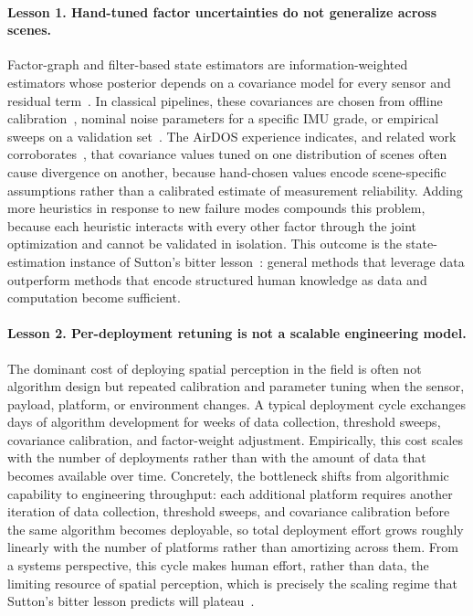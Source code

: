 \paragraph{Lesson 1. Hand-tuned factor uncertainties do not generalize across scenes.}
Factor-graph and filter-based state estimators are information-weighted estimators whose posterior depends on a covariance model for every sensor and residual term~\cite{barfoot2017state}.
In classical pipelines, these covariances are chosen from offline calibration~\cite{rehder2016extending}, nominal noise parameters for a specific IMU grade, or empirical sweeps on a validation set~\cite{qin2018vins}.
The AirDOS experience indicates, and related work corroborates~\cite{yang2020d3vo, muhle2023learning, solodar2023vio}, that covariance values tuned on one distribution of scenes often cause divergence on another, because hand-chosen values encode scene-specific assumptions rather than a calibrated estimate of measurement reliability.
Adding more heuristics in response to new failure modes compounds this problem, because each heuristic interacts with every other factor through the joint optimization and cannot be validated in isolation.
This outcome is the state-estimation instance of Sutton's bitter lesson~\cite{sutton2019bitterlesson}: general methods that leverage data outperform methods that encode structured human knowledge as data and computation become sufficient.

\paragraph{Lesson 2. Per-deployment retuning is not a scalable engineering model.}
The dominant cost of deploying spatial perception in the field is often not algorithm design but repeated calibration and parameter tuning when the sensor, payload, platform, or environment changes.
A typical deployment cycle exchanges days of algorithm development for weeks of data collection, threshold sweeps, covariance calibration, and factor-weight adjustment.
Empirically, this cost scales with the number of deployments rather than with the amount of data that becomes available over time.
Concretely, the bottleneck shifts from algorithmic capability to engineering throughput: each additional platform requires another iteration of data collection, threshold sweeps, and covariance calibration before the same algorithm becomes deployable, so total deployment effort grows roughly linearly with the number of platforms rather than amortizing across them.
From a systems perspective, this cycle makes human effort, rather than data, the limiting resource of spatial perception, which is precisely the scaling regime that Sutton's bitter lesson predicts will plateau~\cite{sutton2019bitterlesson}.

